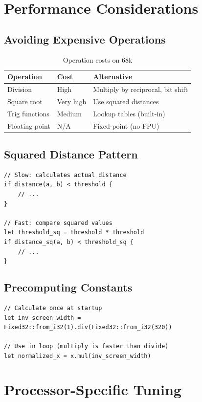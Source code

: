 \section{Performance Considerations}
\label{sec:math-perf}

\subsection{Avoiding Expensive Operations}

\begin{table}[h]
\centering
\begin{tabular}{lll}
\textbf{Operation} & \textbf{Cost} & \textbf{Alternative} \\
\hline
Division & High & Multiply by reciprocal, bit shift \\
Square root & Very high & Use squared distances \\
Trig functions & Medium & Lookup tables (built-in) \\
Floating point & N/A & Fixed-point (no FPU) \\
\end{tabular}
\caption{Operation costs on 68k}
\end{table}

\subsection{Squared Distance Pattern}

\begin{lstlisting}
// Slow: calculates actual distance
if distance(a, b) < threshold {
    // ...
}

// Fast: compare squared values
let threshold_sq = threshold * threshold
if distance_sq(a, b) < threshold_sq {
    // ...
}
\end{lstlisting}

\subsection{Precomputing Constants}

\begin{lstlisting}
// Calculate once at startup
let inv_screen_width = Fixed32::from_i32(1).div(Fixed32::from_i32(320))

// Use in loop (multiply is faster than divide)
let normalized_x = x.mul(inv_screen_width)
\end{lstlisting}

\section{Processor-Specific Tuning}
\label{sec:math-processor}

